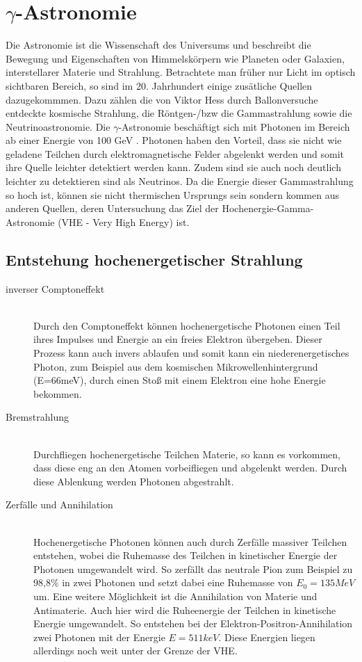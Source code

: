 \chapter{$\gamma$-Astronomie} 
Die Astronomie ist die Wissenschaft des Universums und beschreibt die Bewegung und Eigenschaften von Himmelskörpern wie Planeten oder Galaxien, interstellarer Materie und Strahlung. Betrachtete man früher nur Licht im optisch sichtbaren Bereich, so sind im 20. Jahrhundert einige zusätliche Quellen dazugekommmen. Dazu zählen die von Viktor Hess durch Ballonversuche entdeckte kosmische Strahlung, die Röntgen-/bzw die Gammastrahlung sowie die Neutrinoastronomie. Die $\gamma$-Astronomie beschäftigt sich mit Photonen im Bereich ab einer Energie von 100 GeV \cite{DesignConcept}. Photonen haben den Vorteil, dass sie nicht wie geladene Teilchen durch elektromagnetische Felder abgelenkt werden und somit ihre Quelle leichter detektiert werden kann. Zudem sind sie auch noch deutlich leichter zu detektieren sind als Neutrinos. Da die Energie dieser Gammastrahlung so hoch ist, können sie nicht thermischen Ursprungs sein sondern kommen aus anderen Quellen, deren Untersuchung das Ziel der Hochenergie-Gamma-Astronomie (VHE - Very High Energy) ist.

\section{Entstehung hochenergetischer Strahlung}

\begin{description}
\item[inverser Comptoneffekt]\hfill \\
Durch den Comptoneffekt können hochenergetische Photonen einen Teil ihres Impulses und Energie an ein freies Elektron übergeben. Dieser Prozess kann auch invers ablaufen und somit kann ein niederenergetisches Photon, zum Beispiel aus dem kosmischen Mikrowellenhintergrund (E=66meV), durch einen Stoß mit einem Elektron eine hohe Energie bekommen.
\item[Bremstrahlung]\hfill \\
Durchfliegen hochenergetische Teilchen Materie, so kann es vorkommen, dass diese eng an den Atomen vorbeifliegen und abgelenkt werden. Durch diese Ablenkung werden Photonen abgestrahlt.
\item[Zerfälle und Annihilation]\hfill \\ 
Hochenergetische Photonen können auch durch Zerfälle massiver Teilchen entstehen, wobei die Ruhemasse des Teilchen in kinetischer Energie der Photonen umgewandelt wird. So zerfällt das neutrale Pion zum Beispiel zu 98,8\% \cite{PDG} in zwei Photonen und setzt dabei eine Ruhemasse von $E_0=135MeV$ \cite{PDG} um. Eine weitere Möglichkeit ist die Annihilation von Materie und Antimaterie. Auch hier wird die Ruheenergie der Teilchen in kinetische Energie umgewandelt. So entstehen bei der Elektron-Positron-Annihilation zwei Photonen mit der Energie $E=511keV$.
Diese Energien liegen allerdings noch weit unter der Grenze der VHE.

\end{description}

